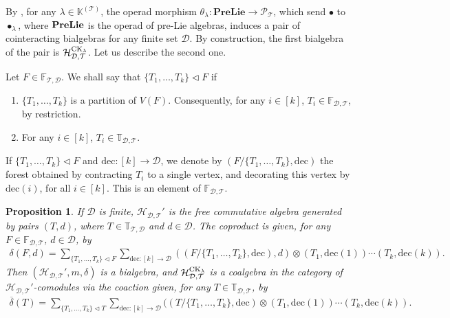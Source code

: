 \documentclass[pdftex]{sigma}
\numberwithin{equation}{section}
\newtheorem{Proposition}[Theorem]{Proposition}
 { \theoremstyle{definition}
\newtheorem{Definition}[Theorem]{Definition}
\newtheorem{Note}[Theorem]{Note}
\newtheorem{Example}[Theorem]{Example}
\newtheorem{Remark}[Theorem]{Remark}
\newtheorem{Notation}[Theorem]{Notation}}
\newcommand{\K}{\mathbb{K}}
\newcommand{\T}{\mathcal{T}}
\newcommand{\D}{\mathcal{D}}
\newcommand{\h}{\mathcal{H}}
\newcommand{\bfT}{\mathbb{T}}
\newcommand{\bfF}{\mathbb{F}}
\renewcommand{\P}{\mathcal{P}}
\newcommand{\dec}{\mathrm{dec}}
\begin{document}
By \cite{FoissyOperads}, for any $\lambda\in \K^{(\T)}$,
the operad morphism $\theta_\lambda\colon \mathbf{PreLie}\longrightarrow \P_\T$, which send $\bullet$ to $\bullet_\lambda$,
where $\bf{PreLie}$ is the operad of pre-Lie algebras,
induces a pair of cointeracting bialgebras for any finite set $\D$.
By construction, the first bialgebra of the pair is $\h_{\D,\T}^{{\rm CK}_\lambda}$. Let us describe the second one.

\begin{Definition}
Let $F\in \bfF_{\T,\D}$. We shall say that $\{T_1,\dots,T_k\}\triangleleft F$ if
\begin{enumerate}\itemsep=0pt
\item $\{T_1,\dots,T_k\}$ is a partition of $V(F)$.
Consequently, for any $i\in [k]$, $T_i\in \bfF_{\D,\T}$, by restriction.
\item For any $i\in [k]$, $T_i\in \bfT_{\D,\T}$.
\end{enumerate}
If $\{T_1,\dots,T_k\}\triangleleft F$ and $\dec\colon [k]\longrightarrow \D$, we denote by $(F/\{T_1,\dots,T_k\},\dec)$
the forest obtained by contracting $T_i$ to a single vertex,
and decorating this vertex by $\dec(i)$, for all $i\in [k]$. This is an element of $\bfF_{\D,\T}$.
\end{Definition}

\begin{Proposition}
If $\D$ is finite, $\h_{\D,\T}'$ is the free commutative algebra generated by pairs $(T,d)$,
where $T\in \bfT_{\T,\D}$ and $d\in \D$.
The coproduct is given, for any $F\in \bfF_{\D,\T}$, $d\in \D$, by
\begin{gather*}
\delta(F,d)=\sum_{\{T_1,\dots,T_k\}\triangleleft F}
\sum_{\dec\colon [k]\longrightarrow \D} ((F/\{T_1,\dots,T_k\},\dec),d)\otimes (T_1,\dec(1))\cdots (T_k,\dec(k)).
\end{gather*}
Then $(\h_{\D,\T}',m,\delta)$ is a bialgebra, and $\h_{\D,\T}^{{\rm CK}_\lambda}$ is a coalgebra
in the category of $\h_{\D,\T}'$-comodules via the coaction given, for any $T\in \bfT_{\D,\T}$, by
\begin{gather*}
\overline{\delta}(T)=\sum_{\{T_1,\dots,T_k\}\triangleleft T}
\sum_{\dec\colon [k]\longrightarrow \D} ((T/\{T_1,\dots,T_k\},\dec)\otimes (T_1,\dec(1))\cdots (T_k,\dec(k)).
\end{gather*}
\end{Proposition}
\end{document}

